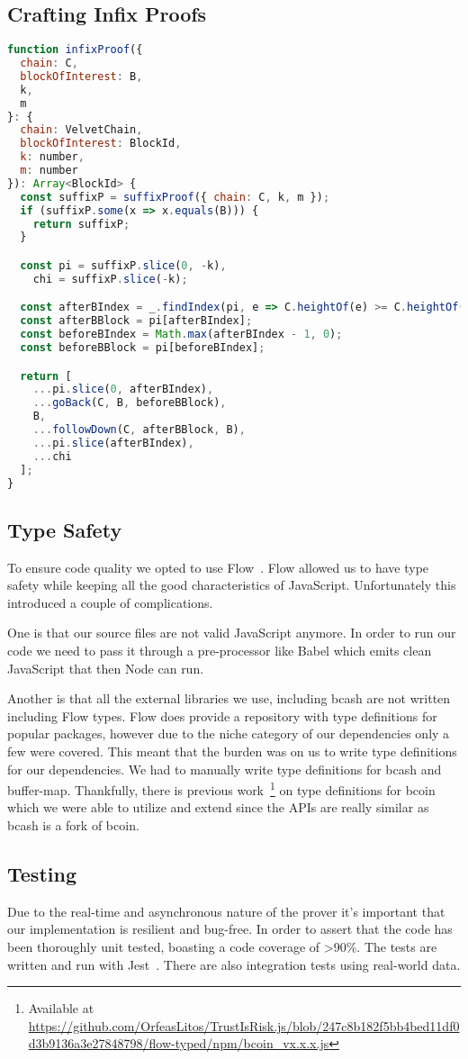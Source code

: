 \subsection{Crafting Infix Proofs}
\begin{lstlisting}[language=Javascript]
function infixProof({
  chain: C,
  blockOfInterest: B,
  k,
  m
}: {
  chain: VelvetChain,
  blockOfInterest: BlockId,
  k: number,
  m: number
}): Array<BlockId> {
  const suffixP = suffixProof({ chain: C, k, m });
  if (suffixP.some(x => x.equals(B))) {
    return suffixP;
  }

  const pi = suffixP.slice(0, -k),
    chi = suffixP.slice(-k);

  const afterBIndex = _.findIndex(pi, e => C.heightOf(e) >= C.heightOf(B));
  const afterBBlock = pi[afterBIndex];
  const beforeBIndex = Math.max(afterBIndex - 1, 0);
  const beforeBBlock = pi[beforeBIndex];

  return [
    ...pi.slice(0, afterBIndex),
    ...goBack(C, B, beforeBBlock),
    B,
    ...followDown(C, afterBBlock, B),
    ...pi.slice(afterBIndex),
    ...chi
  ];
}
\end{lstlisting}

\subsection{Type Safety}
To ensure code quality we opted to use Flow~\cite{flow}. Flow allowed us to have type safety while keeping all the good characteristics of JavaScript. Unfortunately this introduced a couple of complications.

One is that our source files are not valid JavaScript anymore. In order to run our code we need to pass it through a pre-processor like Babel which emits clean JavaScript that then Node can run.

Another is that all the external libraries we use, including bcash are not written including Flow types. Flow does provide a repository with type definitions for popular packages, however due to the niche category of our dependencies only a few were covered. This meant that the burden was on us to write type definitions for our dependencies. We had to manually write type definitions for bcash and buffer-map. Thankfully, there is previous work~\footnote{Available at \url{https://github.com/OrfeasLitos/TrustIsRisk.js/blob/247c8b182f5bb4bed11df0d3b9136a3e27848798/flow-typed/npm/bcoin_vx.x.x.js}} on type definitions for bcoin which we were able to utilize and extend since the APIs are really similar as bcash is a fork of bcoin.

\subsection{Testing}
Due to the real-time and asynchronous nature of the prover it's important that our implementation is resilient and bug-free. In order to assert that the code has been thoroughly unit tested, boasting a code coverage of >90\%. The tests are written and run with Jest~\cite{jest}. There are also integration tests using real-world data.
